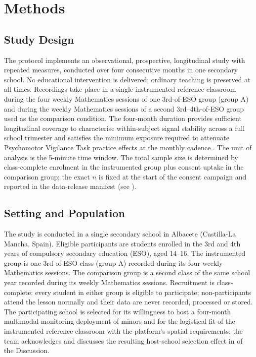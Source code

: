 \section{Methods}\label{sec:methods}

\subsection{Study Design}\label{subsec:design}

The protocol implements an observational, prospective, longitudinal study with repeated measures, conducted over four consecutive months in one secondary school. No educational intervention is delivered; ordinary teaching is preserved at all times. Recordings take place in a single instrumented reference classroom during the four weekly Mathematics sessions of one 3rd-of-ESO group (group A) and during the weekly Mathematics sessions of a second 3rd–4th-of-ESO group used as the comparison condition. The four-month duration provides sufficient longitudinal coverage to characterise within-subject signal stability across a full school trimester and satisfies the minimum exposure required to attenuate Psychomotor Vigilance Task practice effects at the monthly cadence \parencite{Basner2018_pvt_practice}. The unit of analysis is the 5-minute time window. The total sample size is determined by class-complete enrolment in the instrumented group plus consent uptake in the comparison group; the exact $n$ is fixed at the start of the consent campaign and reported in the data-release manifest (see ).

\subsection{Setting and Population}\label{subsec:population}

The study is conducted in a single secondary school in Albacete (Castilla-La Mancha, Spain). Eligible participants are students enrolled in the 3rd and 4th years of compulsory secondary education (ESO), aged 14--16. The instrumented group is one 3rd-of-ESO class (group A) recorded during its four weekly Mathematics sessions. The comparison group is a second class of the same school year recorded during its weekly Mathematics sessions. Recruitment is class-complete: every student in either group is eligible to participate; non-participants attend the lesson normally and their data are never recorded, processed or stored. The participating school is selected for its willingness to host a four-month multimodal-monitoring deployment of minors and for the logistical fit of the instrumented reference classroom with the platform's spatial requirements; the team acknowledges and discusses the resulting host-school selection effect in  of the Discussion.


